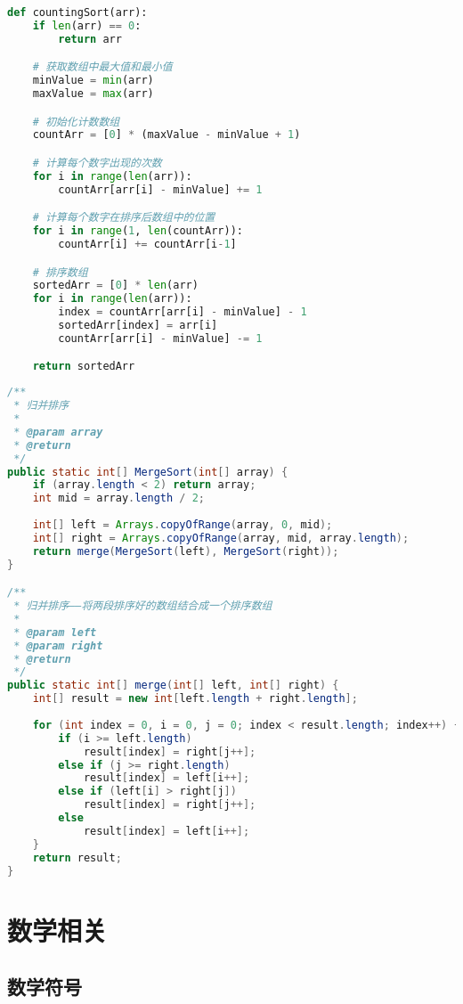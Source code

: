 \documentclass[report,oneside,UTF8,zihao=-4]{config}
\begin{document}
\begin{lstlisting}[label=code:Python, language=Python, caption=Python代码测试]
def countingSort(arr):
    if len(arr) == 0:
        return arr

    # 获取数组中最大值和最小值
    minValue = min(arr)
    maxValue = max(arr)

    # 初始化计数数组
    countArr = [0] * (maxValue - minValue + 1)

    # 计算每个数字出现的次数
    for i in range(len(arr)):
        countArr[arr[i] - minValue] += 1

    # 计算每个数字在排序后数组中的位置
    for i in range(1, len(countArr)):
        countArr[i] += countArr[i-1]

    # 排序数组
    sortedArr = [0] * len(arr)
    for i in range(len(arr)):
        index = countArr[arr[i] - minValue] - 1
        sortedArr[index] = arr[i]
        countArr[arr[i] - minValue] -= 1

    return sortedArr
\end{lstlisting}

\begin{lstlisting}[label=code:Java, language=Java, caption=Java代码测试]
/**
 * 归并排序
 *
 * @param array
 * @return
 */
public static int[] MergeSort(int[] array) {
    if (array.length < 2) return array;
    int mid = array.length / 2;
    
    int[] left = Arrays.copyOfRange(array, 0, mid);
    int[] right = Arrays.copyOfRange(array, mid, array.length);
    return merge(MergeSort(left), MergeSort(right));
}

/**
 * 归并排序——将两段排序好的数组结合成一个排序数组
 *
 * @param left
 * @param right
 * @return
 */
public static int[] merge(int[] left, int[] right) {
    int[] result = new int[left.length + right.length];
    
    for (int index = 0, i = 0, j = 0; index < result.length; index++) {
        if (i >= left.length)
            result[index] = right[j++];
        else if (j >= right.length)
            result[index] = left[i++];
        else if (left[i] > right[j])
            result[index] = right[j++];
        else
            result[index] = left[i++];
    }
    return result;
}
\end{lstlisting}

\chapter{数学相关}

\section{数学符号}
\end{document}
